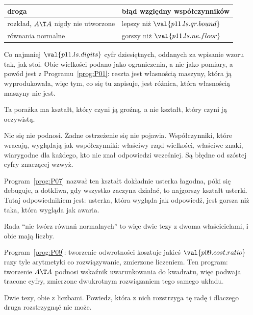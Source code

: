 \begin{fr}
\begin{tabularx}{\linewidth}{@{}lX@{}}
\toprule
\textbf{droga} & \textbf{błąd względny współczynników} \\
\midrule
rozkład, $A\T A$ nigdy nie utworzone & lepszy niż $\val{p11.ls.qr.bound}$ \\
równania normalne & gorszy niż $\val{p11.ls.ne.floor}$ \\
\bottomrule
\end{tabularx}

\medskip
Co najmniej $\val{p11.ls.digits}$ cyfr dziesiętnych, oddanych za wpisanie wzoru
tak, jak stoi. Obie wielkości podano jako ograniczenia, a nie jako pomiary, a
powód jest z Programu~\ref{prog:P01}: reszta jest własnością maszyny, która ją
wyprodukowała, więc tym, co się tu zapisuje, jest różnica, która własnością
maszyny nie jest.
\end{fr}

\begin{fr}
Ta porażka ma kształt, który czyni ją groźną, a nie kształt, który czyni ją
oczywistą.

Nic się nie podnosi. Żadne ostrzeżenie się nie pojawia. Współczynniki, które
wracają, wyglądają jak współczynniki: właściwy rząd wielkości, właściwe znaki,
wiarygodne dla każdego, kto nie znał odpowiedzi wcześniej. Są błędne
od szóstej cyfry znaczącej wzwyż.

Program~\ref{prog:P07} nazwał ten kształt dokładnie \dash{} usterka łagodna,
póki się debuguje, a dotkliwa, gdy wszystko zaczyna działać, to najgorszy
kształt usterki. Tutaj odpowiednikiem jest: usterka, która wygląda jak
odpowiedź, jest gorsza niż taka, która wygląda jak awaria.
\end{fr}

\begin{fr}
Rada \enquote{nie twórz równań normalnych} to więc dwie tezy z dwoma
właścicielami, i obie mają liczby.

Program~\ref{prog:P09}: tworzenie odwrotności kosztuje jakieś
$\val{p09.cost.ratio}$ razy tyle arytmetyki co rozwiązywanie, zmierzone
liczeniem. Ten program: tworzenie $A\T A$ podnosi wskaźnik uwarunkowania do
kwadratu, więc podwaja tracone cyfry, zmierzone dwukrotnym rozwiązaniem tego
samego układu.

Dwie tezy, obie z liczbami. Powiedz, która z nich rozstrzyga tę radę i
dlaczego druga rozstrzygnąć nie może.
\dotline
\nextframe
\end{fr}


